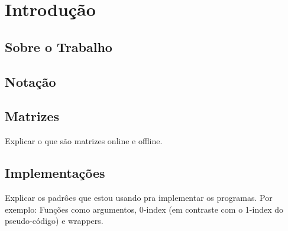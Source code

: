 \section{Introdução}
\label{Introducao}

\subsection{Sobre o Trabalho}

\subsection{Notação}

\subsection{Matrizes}
Explicar o que são matrizes online e offline.

\subsection{Implementações} \label{Intro:impl}
Explicar os padrôes que estou usando pra implementar os programas. Por exemplo: Funções como argumentos, 0-index (em contraste com o 1-index do pseudo-código) e wrappers.
